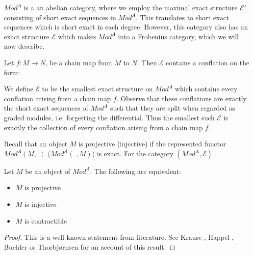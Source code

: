 \documentclass[../thesis.tex]{subfiles}
\begin{document}
            $Mod^A$ is a an abelian category, where we employ the maximal exact structure $\mathcal{E}'$ consisting of short exact sequences in $Mod^A$. This translates to short exact sequences which is short exact in each degree. However, this category also has an exact structure $\mathcal{E}$ which makes $Mod^A$ into a Frobenius category, which we will now describe.

            Let $f : M \rightarrow N$, be a chain map from $M$ to $N$. Then $\mathcal{E}$ contains a conflation on the form:
            \begin{center}
            \end{center}
            We define $\mathcal{E}$ to be the smallest exact structure on $Mod^A$ which contains every conflation arising from a chain map $f$. Observe that these conflations are exactly the short exact sequences of $Mod^A$ such that they are split when regarded as graded modules, i.e. forgetting the differential. Thus the smallest such $\mathcal{E}$ is exactly the collection of every conflation arising from a chain map $f$.

            Recall that an object $M$ is projective (injective) if the represented functor $Mod^A(M,\_)$ ($Mod^A(\_,M)$) is exact. For the category $(Mod^A, \mathcal{E})$

            \begin{proposition}
                Let $M$ be an object of $Mod^A$. The following are equivalent:
                \begin{itemize}
                    \item $M$ is projective
                    \item $M$ is injective
                    \item $M$ is contractible
                \end{itemize}
            \end{proposition}

            \begin{proof}
                This is a well known statement from literature. See Krause \cite{Krause21}, Happel \cite{Happel88}, Buehler \cite{Buhler10} or Thorbjørnsen \cite{Thorbjornsen21} for an account of this result.
            \end{proof}
\end{document}
